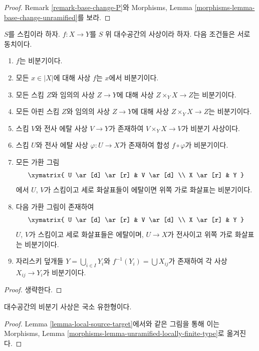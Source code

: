 \begin{proof}
Remark \ref{remark-base-change-P}와 Morphisms, Lemma
\ref{morphisms-lemma-base-change-unramified}를 보라.
\end{proof}

\begin{lemma}
\label{lemma-unramified-local}
$S$를 스킴이라 하자.
$f : X \to Y$를 $S$ 위 대수공간의 사상이라 하자.
다음 조건들은 서로 동치이다.
\begin{enumerate}
\item $f$는 비분기이다.
\item 모든 $x \in |X|$에 대해 사상 $f$는 $x$에서 비분기이다.
\item 모든 스킴 $Z$와 임의의 사상 $Z \to Y$에 대해 사상
$Z \times_Y X \to Z$는 비분기이다.
\item 모든 아핀 스킴 $Z$와 임의의 사상
$Z \to Y$에 대해 사상 $Z \times_Y X \to Z$는 비분기이다.
\item 스킴 $V$와 전사 에탈 사상 $V \to Y$가 존재하여
$V \times_Y X \to V$가 비분기 사상이다.
\item 스킴 $U$와 전사 에탈 사상 $\varphi : U \to X$가 존재하여
합성 $f \circ \varphi$가 비분기이다.
\item 모든 가환 그림
$$
\xymatrix{
U \ar[d] \ar[r] & V \ar[d] \\
X \ar[r] & Y
}
$$
에서 $U$, $V$가 스킴이고 세로 화살표들이 에탈이면 위쪽 가로
화살표는 비분기이다.
\item 다음 가환 그림이 존재하여
$$
\xymatrix{
U \ar[d] \ar[r] & V \ar[d] \\
X \ar[r] & Y
}
$$
$U$, $V$가 스킴이고 세로 화살표들은 에탈이며, $U \to X$가
전사이고 위쪽 가로 화살표는 비분기이다.
\item 자리스키 덮개들 $Y = \bigcup_{i \in I} Y_i$와
$f^{-1}(Y_i) = \bigcup X_{ij}$가 존재하여 각 사상
$X_{ij} \to Y_i$가 비분기이다.
\end{enumerate}
\end{lemma}

\begin{proof}
생략한다.
\end{proof}

\begin{lemma}
\label{lemma-unramified-locally-finite-type}
대수공간의 비분기 사상은 국소 유한형이다.
\end{lemma}

\begin{proof}
Lemma \ref{lemma-local-source-target}에서와 같은 그림을 통해 이는
Morphisms, Lemma \ref{morphisms-lemma-unramified-locally-finite-type}로
옮겨진다.
\end{proof}

